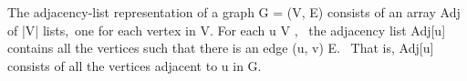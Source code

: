 \documentclass[preview]{standalone}
\begin{document}
\begin{center}
The adjacency-list representation of a graph G = (V, E) consists of an array Adj of |V| lists,\ one for each vertex in V. For each u \in V , \ the adjacency list Adj[u] contains all the vertices such that there is an edge (u, v) \in E. \ That is, Adj[u] consists of all the vertices adjacent to u in G.
\end{center}
\end{document}
